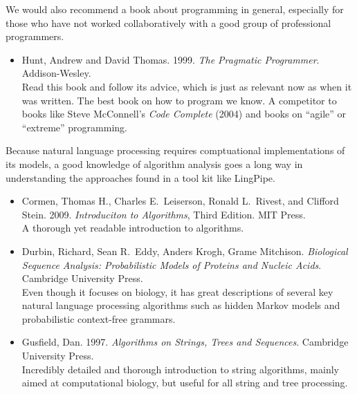 
\noindent
We would also recommend a book about programming in general, 
especially for those who have not worked collaboratively with
a good group of professional programmers.
%
\begin{itemize}
\item Hunt, Andrew and David Thomas.
1999.
{\it The Pragmatic Programmer}.
Addison-Wesley.
\\
{\footnotesize Read this book and follow its advice, which is just as relevant now
as when it was written.  The best book on how to program
we know.  A competitor to books like Steve McConnell's {\it Code Complete} (2004)
and books on ``agile'' or ``extreme'' programming.}
\end{itemize}



\noindent
Because natural language processing requires comptuational
implementations of its models, a good knowledge of algorithm analysis
goes a long way in understanding the approaches found in a tool kit
like LingPipe.

\begin{itemize}
%
\item
Cormen, Thomas H., Charles E.\ Leiserson, Ronald L.\ Rivest, and
Clifford Stein. 
2009.
{\it Introduciton to Algorithms}, Third Edition.
MIT Press.
\\
{\footnotesize A thorough yet readable introduction to algorithms.}
%
\item
Durbin, Richard, Sean R.\ Eddy, Anders Krogh, Grame Mitchison.
{\it Biological Sequence Analysis: Probabilistic Models of Proteins
and Nucleic Acids}.
Cambridge University Press.
\\
{\footnotesize Even though it focuses on biology, it has great
descriptions of several key natural language processing algorithms
such as hidden Markov models and probabilistic context-free grammars.}
%
\item
Gusfield, Dan.
1997.
{\it Algorithms on Strings, Trees and Sequences}.
Cambridge University Press.
\\
{\footnotesize Incredibly detailed and thorough introduction to
string algorithms, mainly aimed at computational biology, but
useful for all string and tree processing.}
%
\end{itemize}







